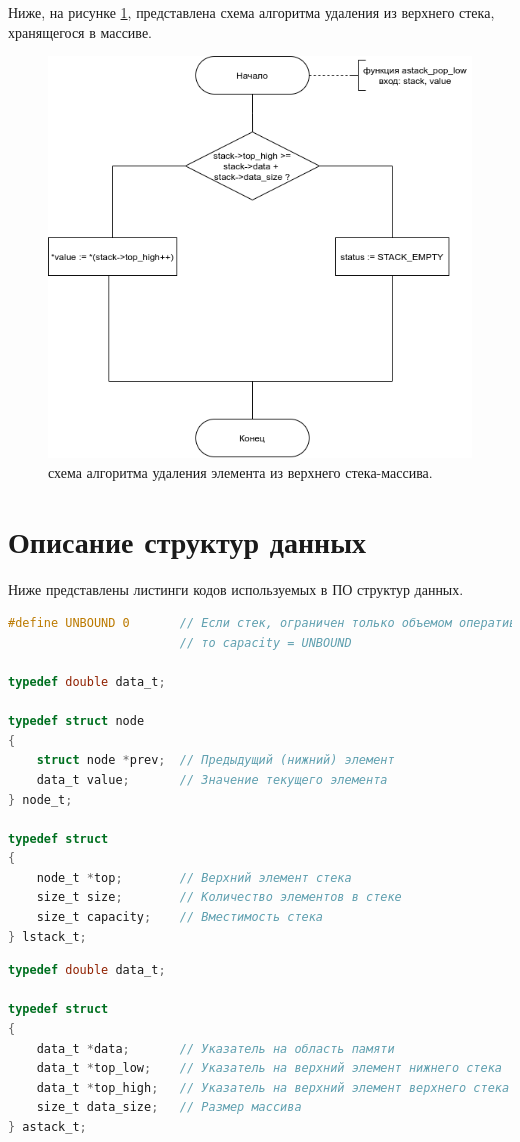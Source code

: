 Ниже, на рисунке \ref{alg:apop-h}, представлена схема алгоритма удаления из верхнего стека, хранящегося в массиве.

\begin{figure}[h]
	\centering
	\includegraphics[width=0.5\linewidth]{img/algo-astack_pop_high.png}
	\caption{схема алгоритма удаления элемента из верхнего стека-массива.}
	\label{alg:apop-h}
\end{figure}

\clearpage

\section{Описание структур данных}

Ниже представлены листинги кодов используемых в ПО структур данных.

\begin{lstlisting}[language=C,caption=Cтек на списке.]
#define UNBOUND 0       // Если стек, ограничен только объемом оперативной памяти
						// то capacity = UNBOUND

typedef double data_t;

typedef struct node
{
	struct node *prev;  // Предыдущий (нижний) элемент
	data_t value;       // Значение текущего элемента
} node_t;

typedef struct
{
	node_t *top;        // Верхний элемент стека
	size_t size;        // Количество элементов в стеке
	size_t capacity;    // Вместимость стека
} lstack_t;
\end{lstlisting}

\begin{lstlisting}[language=C,caption=Стек на массиве]
typedef double data_t;

typedef struct
{
	data_t *data;       // Указатель на область памяти
	data_t *top_low;    // Указатель на верхний элемент нижнего стека
	data_t *top_high;   // Указатель на верхний элемент верхнего стека
	size_t data_size;   // Размер массива
} astack_t;
\end{lstlisting}

